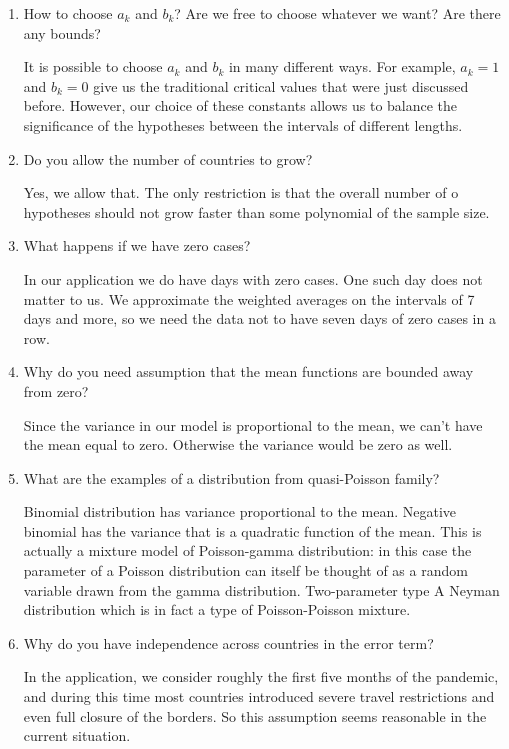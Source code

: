 \documentclass[a4paper,12pt]{article}
\numberwithin{equation}{section}
\begin{document}
\begin{enumerate}
\item How to choose $a_k$ and $b_k$? Are we free to choose whatever we want? Are there any bounds?
	
	It is possible to choose $a_k$ and $b_k$ in many different ways. For example, $a_k = 1$ and $b_k = 0$ give us the traditional critical values that were just discussed before. However, our choice of these constants allows us to balance the significance of the hypotheses between the intervals of different lengths.

\item Do you allow the number of countries to grow?
	
	Yes, we allow that. The only restriction is that the overall number of o hypotheses should not grow faster than some polynomial of the sample size.

\item What happens if we have zero cases?
	
	In our application we do have days with zero cases. One such day does not matter to us. We approximate the weighted averages on the intervals of 7 days and more, so we need the data not to have seven days of zero cases in a row.

\item Why do you need assumption that the mean functions are bounded away from zero?
	
	Since the variance in our model is proportional to the mean, we can't have the mean equal to zero. Otherwise the variance would be zero as well.

\item What are the examples of a distribution from quasi-Poisson family?
	
	Binomial distribution has variance proportional to the mean. Negative binomial has the variance that is a quadratic function of the mean. This is actually a mixture model of Poisson-gamma distribution: in this case the parameter of a Poisson distribution can itself be thought of as a random variable drawn from the gamma distribution. Two-parameter type A Neyman distribution which is in fact a type of Poisson-Poisson mixture.

\item Why do you have independence across countries in the error term?

	In the application, we consider roughly the first five months of the pandemic, and during this time most countries introduced severe travel restrictions and even full closure of the borders. So this assumption seems reasonable in the current situation.


\end{enumerate}
\end{document}
